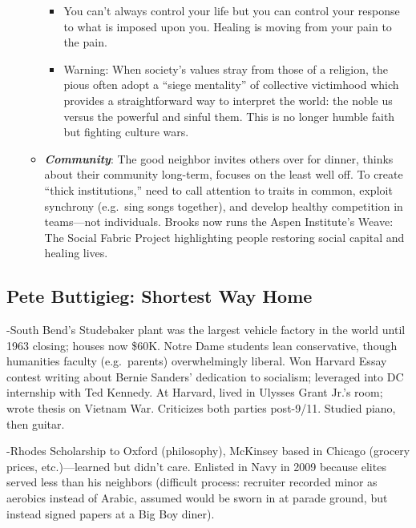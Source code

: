 \documentclass[
]{article}
\begin{document}
\begin{itemize}
\begin{itemize}
    \begin{itemize}
    \item
      You can't always control your life but you can control your
      response to what is imposed upon you. Healing is moving from your
      pain to the pain.
    \item
      Warning: When society's values stray from those of a religion, the
      pious often adopt a ``siege mentality'' of collective victimhood
      which provides a straightforward way to interpret the world: the
      noble us versus the powerful and sinful them. This is no longer
      humble faith but fighting culture wars.
    \end{itemize}
  \item
    \textbf{\emph{Community}}: The good neighbor invites others over for
    dinner, thinks about their community long-term, focuses on the least
    well off. To create ``thick institutions,'' need to call attention
    to traits in common, exploit synchrony (e.g.~sing songs together),
    and develop healthy competition in teams---not individuals. Brooks
    now runs the Aspen Institute's Weave: The Social Fabric Project
    highlighting people restoring social capital and healing lives.
  \end{itemize}
\end{itemize}

\hypertarget{pete-buttigieg-shortest-way-home}{%
\subsection{Pete Buttigieg: Shortest Way
Home}\label{pete-buttigieg-shortest-way-home}}

-South Bend's Studebaker plant was the largest vehicle factory in the
world until 1963 closing; houses now \$60K. Notre Dame students lean
conservative, though humanities faculty (e.g.~parents) overwhelmingly
liberal. Won Harvard Essay contest writing about Bernie Sanders'
dedication to socialism; leveraged into DC internship with Ted Kennedy.
At Harvard, lived in Ulysses Grant Jr.'s room; wrote thesis on Vietnam
War. Criticizes both parties post-9/11. Studied piano, then guitar.

-Rhodes Scholarship to Oxford (philosophy), McKinsey based in Chicago
(grocery prices, etc.)---learned but didn't care. Enlisted in Navy in
2009 because elites served less than his neighbors (difficult process:
recruiter recorded minor as aerobics instead of Arabic, assumed would be
sworn in at parade ground, but instead signed papers at a Big Boy
diner).
\end{document}
